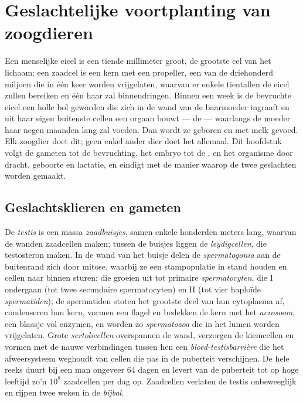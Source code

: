 \chapter{Geslachtelijke voortplanting van zoogdieren}\label{ch:b2:mammal-reproduction}

Een menselijke eicel is een tiende millimeter groot, de grootste cel van
het lichaam; een zaadcel is een kern met een propeller, een van de
driehonderd miljoen die in één keer worden vrijgelaten, waarvan er enkele
tientallen de eicel zullen bereiken en één haar zal binnendringen. Binnen
een week is de bevruchte eicel een holle bol geworden die zich in de wand
van de baarmoeder ingraaft en uit haar eigen buitenste cellen een orgaan
bouwt --- de  --- waarlangs de moeder haar negen maanden lang zal
voeden. Dan wordt ze geboren en met melk gevoed. Elk zoogdier doet dit;
geen enkel ander dier doet het allemaal. Dit hoofdstuk volgt de gameten
tot de bevruchting, het embryo tot de , en het organisme
door dracht, geboorte en lactatie, en eindigt met de manier waarop de
twee geslachten worden gemaakt.

\section{Geslachtsklieren en gameten}

\begin{definition}\label{def:b2:mammal-reproduction:testis}
De \emph{testis} is een massa \emph{zaadbuisjes}, samen enkele honderden
meters lang, waarvan de wanden zaadcellen maken; tussen de buisjes liggen
de \emph{leydigcellen}, die testosteron maken. In de wand van het buisje
delen de \emph{spermatogonia} aan de buitenrand zich door mitose, waarbij
ze een stampopulatie in stand houden en cellen naar binnen sturen; die
groeien uit tot primaire \emph{spermatocyten}, die  I ondergaan (tot
twee secundaire spermatocyten) en  II (tot vier haploïde
\emph{spermatiden}); de spermatiden stoten het grootste deel van hun
cytoplasma af, condenseren hun kern, vormen een flagel en bedekken de kern
met het \emph{acrosoom}, een blaasje vol enzymen, en worden zo
\emph{spermatozoa} die in het lumen worden vrijgelaten. Grote
\emph{sertolicellen} overspannen de wand, verzorgen de kiemcellen en
vormen met de nauwe verbindingen tussen hen een
\emph{bloed-testisbarrière} die het afweersysteem weghoudt van cellen die
pas in de puberteit verschijnen. De hele reeks duurt bij een man ongeveer
\num{64} dagen en levert van de puberteit tot op hoge leeftijd zo'n
$10^{8}$ zaadcellen per dag op. Zaadcellen verlaten de testis onbeweeglijk
en rijpen twee weken in de \emph{bijbal}.
\end{definition}


